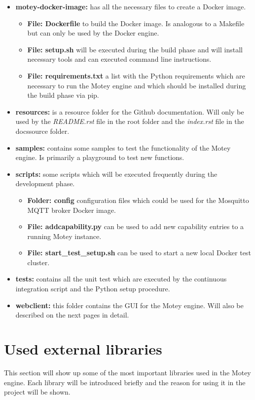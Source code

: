 \begin{itemize}
  \item{\textbf{motey-docker-image:}} has all the necessary files to create a Docker image.
  \begin{itemize}
    \item{\textbf{File: Dockerfile}} to build the Docker image. Is analogous to a Makefile but can only be used by the Docker engine.
    \item{\textbf{File: setup.sh}} will be executed during the build phase and will install necessary tools and can executed command line instructions.
    \item{\textbf{File: requirements.txt}} a list with the Python requirements which are necessary to run the Motey engine and which should be installed during the build phase via pip.
  \end{itemize}
  \item{\textbf{resources:}} is a resource folder for the Github documentation. Will only be used by the \textit{README.rst} file in the root folder and the \textit{index.rst} file in the docs\/source folder.
  \item{\textbf{samples:}} contains some samples to test the functionality of the Motey engine. Is primarily a playground to test new functions.
  \item{\textbf{scripts:}} some scripts which will be executed frequently during the development phase.
  \begin{itemize}
    \item{\textbf{Folder: config}} configuration files which could be used for the Mosquitto \ac{MQTT} broker Docker image.
    \item{\textbf{File: addcapability.py}} can be used to add new capability entries to a running Motey instance.
    \item{\textbf{File: start\_test\_setup.sh}} can be used to start a new local Docker test cluster.
  \end{itemize}
  \item{\textbf{tests:}} contains all the unit test which are executed by the continuous integration script and the Python setup procedure.
  \item{\textbf{webclient:}} this folder contains the \ac{GUI} for the Motey engine. Will also be described on the next pages in detail.
\end{itemize}

\section{Used external libraries}
This section will show up some of the most important libraries used in the Motey engine.
Each library will be introduced briefly and the reason for using it in the project will be shown.

